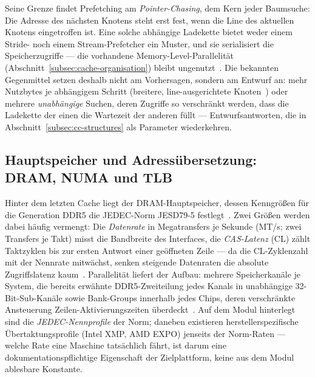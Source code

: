 Seine Grenze findet Prefetching am \emph{Pointer-Chasing}, dem Kern jeder Baumsuche: Die Adresse des
nächsten Knotens steht erst fest, wenn die Line des aktuellen Knotens eingetroffen ist. Eine solche
abhängige Ladekette bietet weder einem Stride- noch einem Stream-Prefetcher ein Muster, und sie
serialisiert die Speicherzugriffe --- die vorhandene Memory-Level-Parallelität
(Abschnitt~\ref{subsec:cache-organisation}) bleibt ungenutzt~\cite{mittal2016prefetching}. Die
bekannten Gegenmittel setzen deshalb nicht am Vorhersagen, sondern am Entwurf an: mehr Nutzbytes je
abhängigem Schritt (breitere, line-ausgerichtete Knoten~\cite{chen2001prefetch}) oder mehrere
\emph{unabhängige} Suchen, deren Zugriffe so verschränkt werden, dass die Ladekette der einen die
Wartezeit der anderen füllt --- Entwurfsantworten, die in
Abschnitt~\ref{subsec:cc-structures} als Parameter wiederkehren.

\subsection{Hauptspeicher und Adressübersetzung: DRAM, NUMA und TLB}\label{subsec:memory-numa-tlb}
Hinter dem letzten Cache liegt der DRAM-Hauptspeicher, dessen Kenngrößen für die Generation DDR5 die
JEDEC-Norm JESD79-5 festlegt~\cite{jedec_jesd79_5}. Zwei Größen werden dabei häufig
vermengt: Die \emph{Datenrate} in Megatransfers je Sekunde (MT/s\@; zwei Transfers je Takt) misst die
Bandbreite des Interfaces, die \emph{CAS-Latenz} (CL) zählt Taktzyklen bis zur ersten Antwort einer
geöffneten Zeile --- da die CL-Zyklenzahl mit der Nennrate mitwächst, senken steigende Datenraten die
absolute Zugriffslatenz kaum~\cite{hennessy2019architecture,micron_ddr5}. Parallelität liefert der
Aufbau: mehrere Speicherkanäle je System, die bereits erwähnte DDR5-Zweiteilung jedes Kanals in
unabhängige 32-Bit-Sub-Kanäle sowie Bank-Groups innerhalb jedes Chips, deren verschränkte
Ansteuerung Zeilen-Aktivierungszeiten überdeckt~\cite{jedec_jesd79_5,micron_ddr5}. Auf dem Modul
hinterlegt sind die \emph{JEDEC-Nennprofile} der Norm; daneben existieren herstellerspezifische
Übertaktungsprofile (Intel XMP, AMD EXPO) jenseits der Norm-Raten --- welche Rate eine Maschine
tatsächlich fährt, ist darum eine dokumentationspflichtige Eigenschaft der Zielplattform, keine aus
dem Modul ablesbare Konstante.

